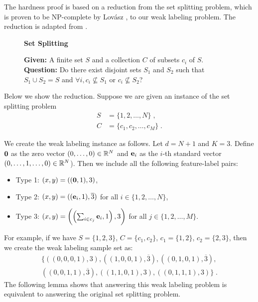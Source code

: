 The hardness proof is based on a reduction from the set splitting problem, which
is proven to be NP-complete by Lov\'asz \cite{Garey-Johnson-1979}, to our weak
labeling problem. The reduction is adapted from \cite{Blum-Rivest-1993}.
\begin{figure}[H]
\begin{framed}
\begin{center}
    \textbf{Set Splitting}
\end{center}
\textbf{Given:} A finite set $S$ and a collection $C$ of subsets $c_i$ of $S$. \\
\textbf{Question:} Do there exist disjoint sets $S_1$ and $S_2$ such that $S_1 \cup S_2 = S$ and $\forall i, c_i\not\subseteq S_1$ or $c_i\not\subseteq S_2$?
\end{framed}
\end{figure}

Below we show the reduction. Suppose we are given an instance of the set
splitting problem
\begin{align*}
S & = \{1, 2, \dots, N\} \; , \\
C & = \{c_1, c_2, \dots, c_M\} \; .
\end{align*}

We create the weak labeling instance as follows. Let $d=N+1$ and $K=3$.
Define $\mathbf{0}$ as the zero vector $(0,\dots,0)\in \mathbb{R}^N$ and $\mathbf{e}_i$ as the
$i$-th standard vector $(0,\dots, 1, \dots, 0)\in \mathbb{R}^N$). Then we include all
the following feature-label pairs:
\begin{itemize}
\item Type 1: $(x,y)=((\mathbf{0},1), 3)$,
\item Type 2: $(x,y)=((\mathbf{e}_i,1), \overline{3})$ for all $i \in \{1,2,\dots,N\}$,
\item Type 3: $(x,y)=\left(\left(\sum_{i\in c_j} \mathbf{e}_i, 1\right), 3\right)$ for all $j \in \{1,2,\dots,M\}$.
\end{itemize}

For example, if we have $S=\{1,2,3\}$, $C=\{c_1, c_2\}$, $c_1 = \{1,2\}$,
$c_2=\{2,3\}$, then we create the weak labeling sample set as:
\begin{multline*}
\{
((0,0,0,1),3), ((1,0,0,1),\overline{3}), ((0,1,0,1),\overline{3}), \\
((0,0,1,1),\overline{3}), ((1,1,0,1),3), ((0,1,1,1),3)
\} \; .
\end{multline*}
The following lemma shows that answering this weak labeling problem is
equivalent to answering the original set splitting problem.

